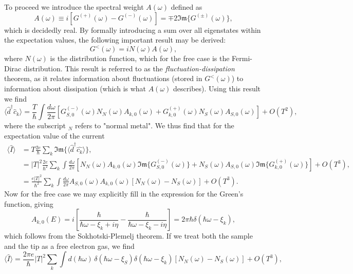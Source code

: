 To proceed we introduce the spectral weight $A(\omega)$ defined as
\begin{equation}
    A(\omega) \equiv i\left[G^{(+)}(\omega)-G^{(-)}(\omega)\right] = \mp2 \mathfrak{Im} \{G^{(\pm)}(\omega)\},
\end{equation}
which is decidedly real. By formally introducing a sum over all eigenstates within the expectation values, the following important result may be derived:
\begin{equation}
    G^<(\omega) = iN(\omega)A(\omega),
\end{equation}
where $N(\omega)$ is the distribution function, which for the free case is the Fermi-Dirac distribution. This result is referred to as the \textit{fluctuation-dissipation} theorem, as it relates information about fluctuations (stored in $G^<(\omega)$) to information about dissipation (which is what $A(\omega)$ describes). Using this result we find
\begin{equation}
     \langle\hat{d}^\dagger\hat{c}_k\rangle = \frac{T}{\hbar}\int\frac{d\omega}{2\pi}\left[G^{(-)}_{S,0}(\omega)N_N(\omega)A_{k,0}(\omega) + G_{k,0}^{(+)}(\omega)N_S(\omega)A_{S,0}(\omega)\right] + O(T^2),
\end{equation}
where the subscript $_N$ refers to "normal metal". We thus find that for the expectation value of the current 
\begin{align}
    \langle\hat{I}\rangle &= T \frac{2e}{\hbar}\sum_k\mathfrak{Im} \{\langle \hat{d}^\dagger\hat{c_k} \rangle \}, \nonumber\\
    &= |T|^2\frac{2e}{\hbar^2} \sum_k \int \frac{d\omega}{2\pi}\left[N_N(\omega)A_{k,0}(\omega) \mathfrak{Im}\{G_{S,0}^{(-)}(\omega)\} + N_S(\omega)A_{S,0}(\omega)\mathfrak{Im} \{G_{k,0}^{(+)}(\omega)\}\right] + O(T^3),\nonumber \\
    &= \frac{e|T|^2}{\hbar^2}\sum_k \int \frac{d\omega}{2\pi} A_{S,0}(\omega)A_{k,0}(\omega)\left[N_N(\omega)-N_S(\omega)\right] + O(T^3).
\end{align}
Now for the free case we may explicitly fill in the expression for the Green's function, giving
\begin{equation}
    A_{k,0}(E) = i\left[\frac{\hbar}{\hbar\omega-\xi_k+i\eta} - \frac{\hbar}{\hbar\omega-\xi_k-i\eta}\right] = 2\pi\hbar \delta(\hbar\omega-\xi_k),
\end{equation}
which follows from the Sokhotski-Plemelj theorem. If we treat both the sample and the tip as a free electron gas, we find
\begin{equation}
    \langle\hat{I}\rangle =  \frac{2\pi e}{\hbar}|T|^2 \sum_k \int d(\hbar\omega) \, \delta(\hbar\omega-\xi_S)\delta(\hbar\omega-\xi_k)\left[N_N(\omega)-N_S(\omega)\right] + O(T^3),
\end{equation}
